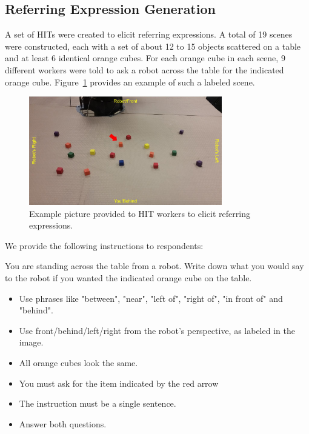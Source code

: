 \documentclass[letterpaper,10pt]{article}
\begin{document}
\subsection{Referring Expression Generation}
A set of HITs were created to elicit referring expressions. A total of 19 scenes were constructed, each with a set of about 12 to 15 objects scattered on a table and at least 6 identical orange cubes. For each orange cube in each scene, 9 different workers were told to ask a robot across the table for the indicated orange cube. Figure~\ref{fig:ref_expr_elicit_pic} provides an example of such a labeled scene.

\begin{figure}[htb]
  \centering
    \includegraphics[width=0.75\textwidth]{ref_expr_elicit_pic}
  \caption{Example picture provided to HIT workers to elicit referring expressions.}
  \label{fig:ref_expr_elicit_pic}
\end{figure}

We provide the following instructions to respondents:

\begin{framed}
You are standing across the table from a robot. Write down what you would say to the robot if you wanted the indicated orange cube on the table.
\begin{itemize}[topsep=0pt,itemsep=-1ex,partopsep=1ex,parsep=1ex]
\item Use phrases like "between", "near", "left of", "right of", "in front of" and "behind".
\item Use front/behind/left/right from the robot's perspective, as labeled in the image. 
\item All orange cubes look the same.
\item You must ask for the item indicated by the red arrow
\item The instruction must be a single sentence.
\item Answer both questions.
\end{itemize}
\end{framed}
\end{document}
